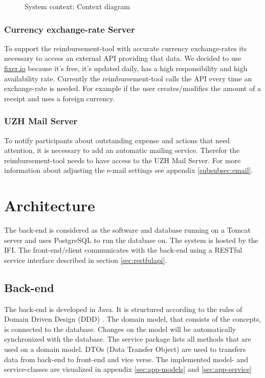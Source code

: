 \begin{figure}[H]
    \centering
    \caption{System context: Context diagram}
    \label{fig:context-diagram}
\end{figure}

\subsubsection{Currency exchange-rate Server}

To support the reimbursement-tool with accurate currency exchange-rates its necessary to access an external API providing that data. We decided to use \url{fixer.io} \cite{fixer} because it's free, it's updated daily, has a high responsibility and high availability rate. Currently the reimbursement-tool calls the API every time an exchange-rate is needed. For example if the user creates/modifies the amount of a receipt and uses a foreign currency. 

\subsubsection{UZH Mail Server}

To notify participants about outstanding expense and actions that need attention, it is necessary to add an automatic mailing service. Therefor the reimbursement-tool needs to have access to the UZH Mail Server. For more information about adjusting the e-mail settings see appendix \ref{subsubsec:email}.\newpage


\section{Architecture}

The back-end is considered as the software and database running on a Tomcat \cite{tomcat} server and uses PostgreSQL \cite{postgresql} to run the database on. The system is hosted by the IFI. The front-end/client communicates with the back-end using a RESTful service interface described in section \ref{sec:restfulapi}.

\subsection{Back-end}
The back-end is developed in Java. It is structured according to the rules of Domain Driven Design (DDD) \cite{ddd}. The domain model, that consists of the concepts, is connected to the database. Changes on the model will be automatically synchronized with the database. The service package lists all methods that are used on a domain model.\newline 
DTOs (Data Transfer Object) are used to transfers data from back-end to front-end and vice verse. \newline The implemented model- and service-classes are visualized in appendix \ref{sec:app-models} and \ref{sec:app-service}  

